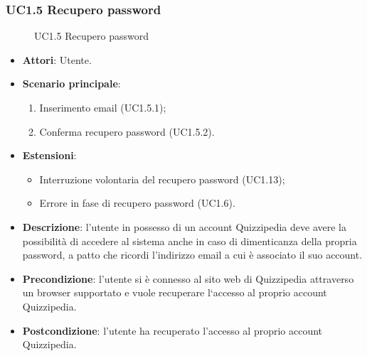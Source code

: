 \subsubsection{UC1.5 Recupero password}
\begin{figure}[H]
\centering
\noindent{}
\caption{UC1.5 Recupero password}
\end{figure}
\begin{itemize}
\item \textbf{Attori}: Utente.
\item \textbf{Scenario principale}:
\begin{enumerate}
\item Inserimento email (UC1.5.1);
\item Conferma recupero password (UC1.5.2).
\end{enumerate}
\item \textbf{Estensioni}:
\begin{itemize}
\item Interruzione volontaria del recupero password (UC1.13);
\item Errore in fase di recupero password (UC1.6).
\end{itemize}
\item \textbf{Descrizione}: l’utente in possesso di un account Quizzipedia deve avere la possibilità di accedere al sistema anche in caso di dimenticanza della propria password, a patto che ricordi l’indirizzo email a cui è associato il suo account.
\item \textbf{Precondizione}: l'utente si è connesso al sito web di Quizzipedia attraverso un browser supportato e vuole recuperare l‘accesso al proprio account Quizzipedia.
\item \textbf{Postcondizione}: l’utente ha recuperato l’accesso al proprio account Quizzipedia.
\end{itemize}
